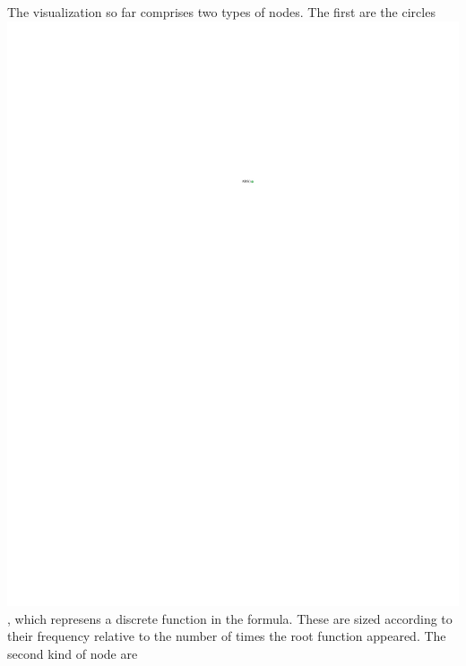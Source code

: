 \documentclass[conference]{IEEEtran}
\begin{document}
	The visualization so far comprises two types of nodes. The first are the
	circles \includegraphics{glossary-greenonly}, which represens a discrete
	function in the formula. These are sized according to their frequency relative
	to the number of times the root function appeared. The second kind of node are
\end{document}
